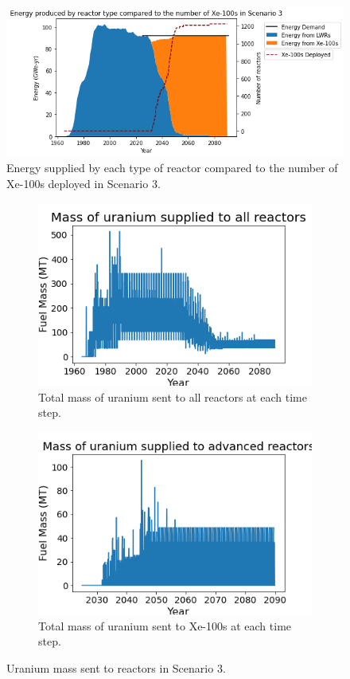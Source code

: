 \begin{figure}
    \centering 
    \includegraphics[scale=0.5]{figures/energy_scenario3.png}
    \caption{Energy supplied by each type of reactor compared to the number of 
    Xe-100s deployed in Scenario 3.}
    \label{fig:energy_rx_3}
\end{figure}

\begin{figure}
    \centering
    \begin{subfigure}{0.4\textwidth}
        \centering
        \includegraphics[scale=0.3]{figures/fuelsupply_scenarios_3.png}
        \caption{Total mass of uranium sent to all reactors at each time step.}
        \label{fig:totalfuel_3}
    \end{subfigure}
    \begin{subfigure}{0.4\textwidth}
        \centering
        \includegraphics[scale=0.3]{figures/advancedRX_fuelsupply_scenarios_3.png}
        \caption{Total mass of uranium sent to Xe-100s at each time step.}
        \label{fig:haleu_3}
    \end{subfigure}
    \caption{Uranium mass sent to reactors in Scenario 3.}
    \label{fig:fuel_3}
\end{figure}


